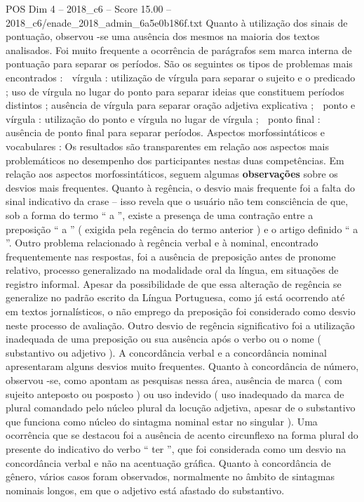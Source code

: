 \begin{textsample}{POS Dim 4 – 2018\_c6 – Score 15.00 – 2018\_c6/enade\_2018\_admin\_6a5e0b186f.txt}
Quanto à utilização dos sinais de pontuação, observou -se uma ausência dos mesmos na maioria dos textos analisados.
Foi muito frequente a ocorrência de parágrafos sem marca interna de pontuação para separar os períodos.
São os seguintes os tipos de problemas mais encontrados :  vírgula : utilização de vírgula para separar o sujeito e o predicado ; uso de vírgula no lugar do ponto para separar ideias que constituem períodos distintos ; ausência de vírgula para separar oração adjetiva explicativa ;  ponto e vírgula : utilização do ponto e vírgula no lugar de vírgula ;  ponto final : ausência de ponto final para separar períodos.
Aspectos morfossintáticos e vocabulares : Os resultados são transparentes em relação aos aspectos mais problemáticos no desempenho dos participantes nestas duas competências.
Em relação aos aspectos morfossintáticos, seguem algumas \textbf{observações} sobre os desvios mais frequentes.
Quanto à regência, o desvio mais frequente foi a falta do sinal indicativo da crase – isso revela que o usuário não tem consciência de que, sob a forma do termo “ a ”, existe a presença de uma contração entre a preposição “ a ” ( exigida pela regência do termo anterior ) e o artigo definido “ a ”.
Outro problema relacionado à regência verbal e à nominal, encontrado frequentemente nas respostas, foi a ausência de preposição antes de pronome relativo, processo generalizado na modalidade oral da língua, em situações de registro informal.
Apesar da possibilidade de que essa alteração de regência se generalize no padrão escrito da Língua Portuguesa, como já está ocorrendo até em textos jornalísticos, o não emprego da preposição foi considerado como desvio neste processo de avaliação.
Outro desvio de regência significativo foi a utilização inadequada de uma preposição ou sua ausência após o verbo ou o nome ( substantivo ou adjetivo ).
A concordância verbal e a concordância nominal apresentaram alguns desvios muito frequentes.
Quanto à concordância de número, observou -se, como apontam as pesquisas nessa área, ausência de marca ( com sujeito anteposto ou posposto ) ou uso indevido ( uso inadequado da marca de plural comandado pelo núcleo plural da locução adjetiva, apesar de o substantivo que funciona como núcleo do sintagma nominal estar no singular ).
Uma ocorrência que se destacou foi a ausência de acento circunflexo na forma plural do presente do indicativo do verbo “ ter ”, que foi considerada como um desvio na concordância verbal e não na acentuação gráfica.
Quanto à concordância de gênero, vários casos foram observados, normalmente no âmbito de sintagmas nominais longos, em que o adjetivo está afastado do substantivo.

\end{textsample}
